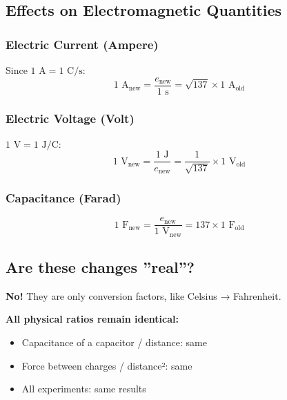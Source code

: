 	\subsection{Effects on Electromagnetic Quantities}
	
	\subsubsection{Electric Current (Ampere)}
	
	Since $1 \text{ A} = 1 \text{ C/s}$:
	\begin{equation}
		1 \text{ A}_{\text{new}} = \frac{e_{\text{new}}}{1 \text{ s}} = \sqrt{137} \times 1 \text{ A}_{\text{old}}
	\end{equation}
	
	\subsubsection{Electric Voltage (Volt)}
	
	$1 \text{ V} = 1 \text{ J/C}$:
	\begin{equation}
		1 \text{ V}_{\text{new}} = \frac{1 \text{ J}}{e_{\text{new}}} = \frac{1}{\sqrt{137}} \times 1 \text{ V}_{\text{old}}
	\end{equation}
	
	\subsubsection{Capacitance (Farad)}
	
	\begin{equation}
		1 \text{ F}_{\text{new}} = \frac{e_{\text{new}}}{1 \text{ V}_{\text{new}}} = 137 \times 1 \text{ F}_{\text{old}}
	\end{equation}
	
	\subsection{Are these changes ''real''?}
	
	\textbf{No!} They are only conversion factors, like Celsius → Fahrenheit.
	
	\textbf{All physical ratios remain identical:}
	\begin{itemize}
		\item Capacitance of a capacitor / distance: same
		\item Force between charges / distance²: same
		\item All experiments: same results
	\end{itemize}
	
